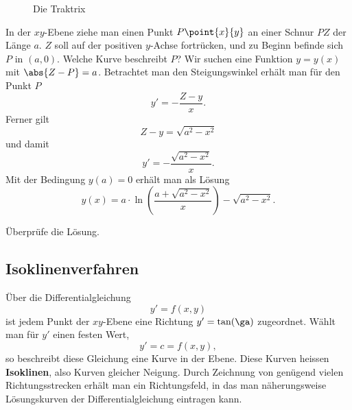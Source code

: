 \documentclass[%
11pt,%
twoside,%
titlepage,%
german,%
headsepline%
]{scrartcl}
\begin{document}
\begin{figure}
\vspace{-5pt}
\begin{center}
\end{center}
\caption{Die Traktrix}
\vspace{-5pt}
\end{figure}
In
der $xy$-Ebene ziehe man einen Punkt $P\point{x}{y}$ an einer Schnur $PZ$ der L\"ange $a$. $Z$ soll auf der positiven $y$-Achse fortr\"ucken, und zu Beginn befinde sich $P$ in $(a,0)$. Welche Kurve beschreibt $P$?
Wir suchen eine Funktion $y=y(x)$ mit $\abs{Z-P}=a$. Betrachtet man den Steigungswinkel erh\"alt man f\"ur den Punkt $P$
$$y'=-\frac{Z-y}{x}.$$
Ferner gilt
$$Z-y=\sqrt{a^2-x^2}$$ und damit
$$y'=-\frac{\sqrt{a^2-x^2}}{x}.$$
Mit der Bedingung $y(a)=0$ erh\"alt man als L\"osung
$$y(x)=a\cdot\ln\left(\frac{a+\sqrt{a^2-x^2}}{x}\right)-\sqrt{a^2-x^2}.$$

\begin{ueb}
\"Uberpr\"ufe die L\"osung.
\end{ueb}

\subsection{Isoklinenverfahren}

\"Uber die Differentialgleichung
$$y'=f(x,y)$$
ist jedem Punkt der $xy$-Ebene eine Richtung $y'=\tan(\ga)$ zugeordnet. W\"ahlt man f\"ur $y'$ einen festen Wert,
$$y'=c=f(x,y),$$
so beschreibt diese Gleichung eine Kurve in der Ebene.
Diese Kurven heissen \textbf{Isoklinen}, also Kurven gleicher Neigung. Durch Zeichnung von gen\"ugend vielen Richtungsstrecken erh\"alt man ein Richtungsfeld, in das man n\"aherungsweise L\"osungskurven der Differentialgleichung eintragen kann.
\end{document}
